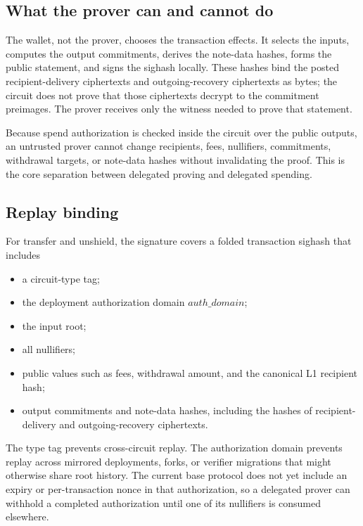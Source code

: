 \documentclass[11pt]{article}
\begin{document}
\subsection{What the prover can and cannot do}

The wallet, not the prover, chooses the transaction effects. It selects the
inputs, computes the output commitments, derives the note-data hashes, forms
the public statement, and signs the sighash locally. These hashes bind the
posted recipient-delivery ciphertexts and outgoing-recovery ciphertexts as
bytes; the circuit does not prove that those ciphertexts decrypt to the
commitment preimages. The prover receives only the witness needed to prove that
statement.

Because spend authorization is checked inside the circuit over the public
outputs, an untrusted prover cannot change recipients, fees, nullifiers,
commitments, withdrawal targets, or note-data hashes without invalidating the
proof. This is the core separation between delegated proving and delegated
spending.

\subsection{Replay binding}

For transfer and unshield, the signature covers a folded transaction sighash
that includes

\begin{itemize}
  \item a circuit-type tag;
  \item the deployment authorization domain \(auth\_domain\);
  \item the input root;
  \item all nullifiers;
  \item public values such as fees, withdrawal amount, and the canonical L1
        recipient hash;
  \item output commitments and note-data hashes, including the hashes of
        recipient-delivery and outgoing-recovery ciphertexts.
\end{itemize}

The type tag prevents cross-circuit replay. The authorization domain prevents
replay across mirrored deployments, forks, or verifier migrations that might
otherwise share root history. The current base protocol does not yet include an
expiry or per-transaction nonce in that authorization, so a delegated prover
can withhold a completed authorization until one of its nullifiers is consumed
elsewhere.
\end{document}
